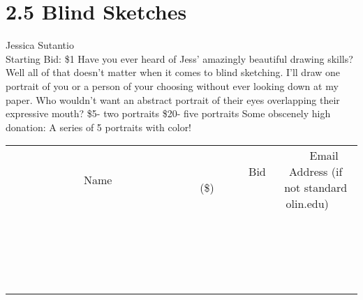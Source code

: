\documentclass[11pt]{article}
\begin{document}
\section*{2.5 Blind Sketches}
Jessica Sutantio
\\
Starting Bid: \$1
\newline
Have you ever heard of Jess' amazingly beautiful drawing skills? Well all of that doesn't matter when it comes to blind sketching. I'll draw one portrait of you or a person of your choosing without ever looking down at my paper. Who wouldn't want an abstract portrait of their eyes overlapping their expressive mouth?
\$5- two portraits
\$20- five portraits
Some obscenely high donation: A series of 5 portraits with color!
\\[3ex]
\begin{tabular}{c c c}
~~~~~~~~~~~~~Name~~~~~~~~~~~~~ & ~~~~~~~~~Bid (\$)~~~~~~~~~  & ~~~Email Address (if not standard olin.edu)~~~\\
 & & \\
\hline
 & & \\
\hline
 & & \\
\hline
 & & \\
\hline
 & & \\
\hline
 & & \\
\hline
 & & \\
\hline
 & & \\
\hline
 & & \\
\hline
 & & \\
\hline
 & & \\
\hline
 & & \\
\hline
 & & \\
\hline
 & & \\
\hline
 & & \\
\hline
 & & \\
\hline
 & & \\
\hline
 & & \\
\hline
 & & \\
\hline
\end{tabular}
\newpage
\end{document}
